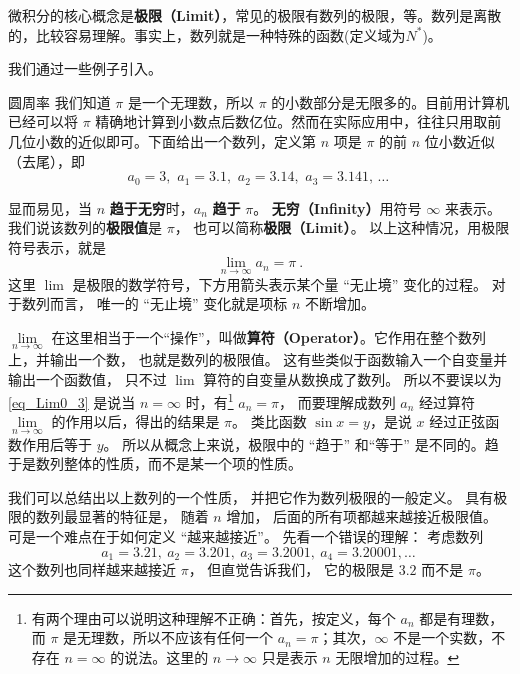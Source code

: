 
微积分的核心概念是\textbf{极限（Limit）}，常见的极限有数列的极限，等。数列是离散的，比较容易理解。事实上，数列就是一种特殊的函数(定义域为$N^{*}$)。

我们通过一些例子引入。

\begin{example}{圆周率}\label{ex_Lim0_1}
我们知道 $\pi$ 是一个无理数，所以 $\pi$ 的小数部分是无限多的。目前用计算机已经可以将 $\pi$ 精确地计算到小数点后数亿位。然而在实际应用中，往往只用取前几位小数的近似即可。下面给出一个数列，定义第 $n$ 项是 $\pi$ 的前 $n$ 位小数近似（去尾），即
\begin{equation}\label{eq_Lim0_1}
a_0 = 3,\,\, a_1 = 3.1,\,\, a_2 = 3.14,\,\, a_3 = 3.141,\,\dots~
\end{equation}

显而易见，当 $n$ \textbf{趋于无穷}时，$a_n$ \textbf{趋于} $\pi$。 \textbf{无穷（Infinity）}用符号 $\infty$ 来表示。 我们说该数列的\textbf{极限值}是 $\pi$， 也可以简称\textbf{极限（Limit）}。 以上这种情况，用极限符号表示，就是
\begin{equation}\label{eq_Lim0_3}
\lim_{n \to \infty } {a_n} = \pi ~.
\end{equation}
这里 $\lim$ 是极限的数学符号，下方用箭头表示某个量 “无止境” 变化的过程。 对于数列而言， 唯一的 “无止境” 变化就是项标 $n$ 不断增加。%
\end{example}

$\lim\limits_{n \to \infty }$ 在这里相当于一个“操作”，叫做\textbf{算符（Operator）}。它作用在整个数列上，并输出一个数， 也就是数列的极限值。 这有些类似于函数输入一个自变量并输出一个函数值， 只不过 $\lim$ 算符的自变量从数换成了数列。 所以不要误以为\autoref{eq_Lim0_3} 是说当 $n = \infty$ 时，有\footnote{有两个理由可以说明这种理解不正确：首先，按定义，每个 $a_n$ 都是有理数，而 $\pi$ 是无理数，所以不应该有任何一个 $a_n=\pi$；其次，$\infty$ 不是一个实数，不存在 $n=\infty$ 的说法。这里的 $n\to\infty$ 只是表示 $n$ 无限增加的过程。} $a_n=\pi$， 而要理解成数列 $a_n$ 经过算符 $\lim\limits_{n \to \infty }$ 的作用以后，得出的结果是 $\pi$。 类比函数 $\sin x = y$，是说 $x$ 经过正弦函数作用后等于 $y$。 所以从概念上来说，极限中的 “趋于” 和“等于” 是不同的。趋于是数列整体的性质，而不是某一个项的性质。

我们可以总结出以上数列的一个性质， 并把它作为数列极限的一般定义。 具有极限的数列最显著的特征是， 随着 $n$ 增加， 后面的所有项都越来越接近极限值。 可是一个难点在于如何定义 “越来越接近”。 先看一个错误的理解： 考虑数列
\begin{equation}\label{eq_Lim0_2}
a_1 = 3.21,\ a_2 = 3.201,\ a_3 = 3.2001,\ a_4 = 3.20001, \dots~
\end{equation}
这个数列也同样越来越接近 $\pi$， 但直觉告诉我们， 它的极限是 $3.2$ 而不是 $\pi$。

